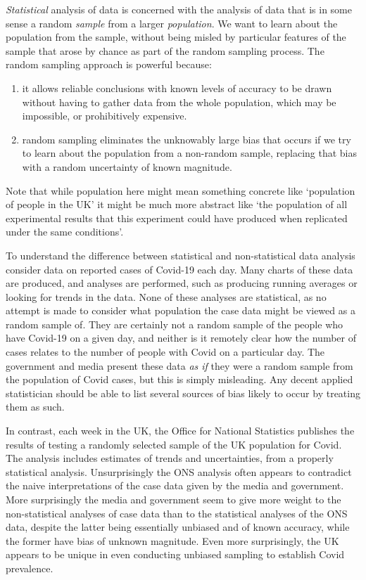 \documentclass[10pt] {article}
\theoremstyle{definition}
\begin{document}
{\em Statistical} analysis of data is concerned with the analysis of data that is in some sense a random {\em sample} from a larger {\em population}. We want to learn about the population from the sample, without being misled by particular features of the sample that arose by chance as part of the random sampling process. The random sampling approach is powerful because: 
\begin{enumerate}
\item it allows reliable conclusions with known levels of accuracy to be drawn without having to gather data from the whole population, which may be impossible, or prohibitively expensive.       
\item random sampling eliminates the unknowably large bias that occurs if we try to learn about the population from a non-random sample, replacing that bias with a random uncertainty of known magnitude.   
\end{enumerate}
Note that while population here might mean something concrete like `population of people in the UK' it might be much more abstract like `the population of all experimental results that this experiment could have produced when replicated under the same conditions'.

To understand the difference between statistical and non-statistical data analysis consider data on reported cases of Covid-19 each day. Many charts of these data are produced, and analyses are performed, such as producing running averages or looking for trends in the data. None of these analyses are statistical, as no attempt is made to consider what population the case data might be viewed as a random sample of. They are certainly not a random sample of the people who have Covid-19 on a given day, and neither is it remotely clear how the number of cases relates to the number of people with Covid on a particular day.  The government and media present these data {\em as if} they were a random sample from the population of Covid cases, but this is simply misleading. Any decent applied statistician should be able to list several sources of bias likely to occur by treating them as such. 

In contrast, each week in the UK, the Office for National Statistics publishes the results of testing a randomly selected sample of the UK population for Covid. The analysis includes estimates of trends and uncertainties, from a properly statistical analysis. Unsurprisingly the ONS analysis often appears to contradict the naive interpretations of the case data given by the media and government. More surprisingly the media and government seem to give more weight to the non-statistical analyses of case data than to the statistical analyses of the ONS data, despite the latter being essentially unbiased and of known accuracy, while the former have bias of unknown magnitude. Even more surprisingly, the UK appears to be unique in even conducting unbiased sampling to establish Covid prevalence.
\end{document}

